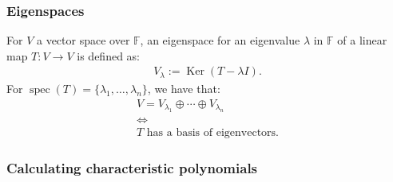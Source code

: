 \documentclass[a4paper, 12pt, twoside]{article}
\DeclareMathOperator{\Ker}{Ker}
\DeclareMathOperator{\Spec}{spec}
\begin{document}
\subsubsection{Eigenspaces}

For $V$ a vector space over $\mathbb{F}$, an eigenspace for an 
eigenvalue $\lambda$ in $\mathbb{F}$ of a linear map $T:V \to V$
is defined as:
\begin{align*}
  V_{\lambda} := \Ker(T - \lambda I).
\end{align*}
For $\Spec(T) = \{\lambda_1, \ldots, \lambda_n\}$, we have that:
\begin{gather*}
  V = V_{\lambda_1} \oplus \cdots \oplus V_{\lambda_n} \\
  \Longleftrightarrow \\
  T \text{ has a basis of eigenvectors}.
\end{gather*}

\newpage

\subsubsection{Calculating characteristic polynomials}
\end{document}
